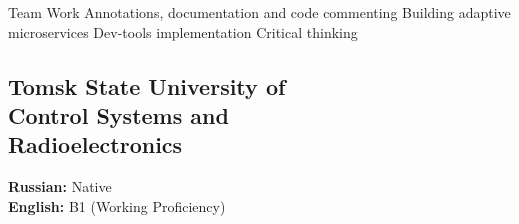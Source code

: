 \documentclass[a4paper]{MagicalCV}
\begin{document}
\begin{minipage}[t]{0.33\textwidth}

Team Work \textbullet{}
Annotations, documentation and code commenting \textbullet{}
Building adaptive microservices \textbullet{}
Dev-tools implementation \textbullet{}
Critical thinking
\sectionsep


\subsection{Tomsk State University of \\ Control Systems and \\ Radioelectronics}
\vspace{\topsep} %
\sectionsep


\textbf{Russian:} Native \\
\textbf{English:} B1 (Working Proficiency)
\sectionsep

\end{minipage} 
\hfill
\end{document}
